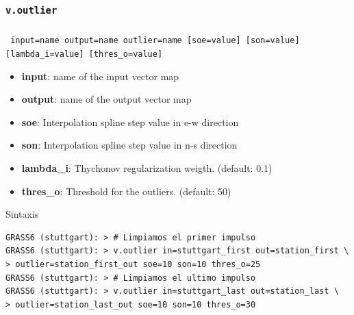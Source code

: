 \subsubsection{\texttt{v.outlier}}
\begin{frame}[fragile,shrink=5]
  \frametitle{}
  \begin{beamerboxesrounded}[shadow=true]{\textbf{}
    \texttt{ input=name output=name outlier=name [soe=value] [son=value] 
    [lambda\_i=value] [thres\_o=value]}}
    \begin{itemize}
      \item \textbf{input}: name of the input vector map
      \item \textbf{output}: name of the output vector map
      \item \textbf{soe}: Interpolation spline step value in e-w direction
      \item \textbf{son}: Interpolation spline step value in n-s direction
      \item \textbf{lambda\_i}: Thychonov regularization weigth. (default: 0.1)
      \item \textbf{thres\_o}: Threshold for the outliers. (default: 50)
    \end{itemize}
  \end{beamerboxesrounded}
  \begin{beamerboxesrounded}[shadow=true]{Sintaxis}
\scriptsize
\begin{verbatim}
GRASS6 (stuttgart): > # Limpiamos el primer impulso
GRASS6 (stuttgart): > v.outlier in=stuttgart_first out=station_first \
> outlier=station_first_out soe=10 son=10 thres_o=25
GRASS6 (stuttgart): > # Limpiamos el ultimo impulso
GRASS6 (stuttgart): > v.outlier in=stuttgart_last out=station_last \
> outlier=station_last_out soe=10 son=10 thres_o=30
\end{verbatim}
\end{beamerboxesrounded}
\end{frame}
